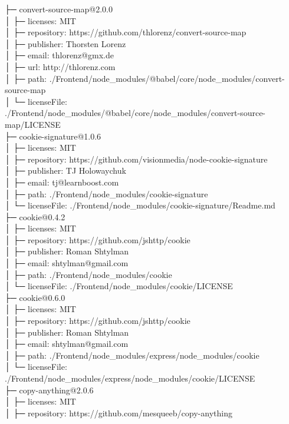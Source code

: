 ├─ convert-source-map@2.0.0\\
│  ├─ licenses: MIT\\
│  ├─ repository: https://github.com/thlorenz/convert-source-map\\
│  ├─ publisher: Thorsten Lorenz\\
│  ├─ email: thlorenz@gmx.de\\
│  ├─ url: http://thlorenz.com\\
│  ├─ path: ./Frontend/node\_modules/@babel/core/node\_modules/convert-source-map\\
│  └─ licenseFile: ./Frontend/node\_modules/@babel/core/node\_modules/convert-source-map/LICENSE\\
├─ cookie-signature@1.0.6\\
│  ├─ licenses: MIT\\
│  ├─ repository: https://github.com/visionmedia/node-cookie-signature\\
│  ├─ publisher: TJ Holowaychuk\\
│  ├─ email: tj@learnboost.com\\
│  ├─ path: ./Frontend/node\_modules/cookie-signature\\
│  └─ licenseFile: ./Frontend/node\_modules/cookie-signature/Readme.md\\
├─ cookie@0.4.2\\
│  ├─ licenses: MIT\\
│  ├─ repository: https://github.com/jshttp/cookie\\
│  ├─ publisher: Roman Shtylman\\
│  ├─ email: shtylman@gmail.com\\
│  ├─ path: ./Frontend/node\_modules/cookie\\
│  └─ licenseFile: ./Frontend/node\_modules/cookie/LICENSE\\
├─ cookie@0.6.0\\
│  ├─ licenses: MIT\\
│  ├─ repository: https://github.com/jshttp/cookie\\
│  ├─ publisher: Roman Shtylman\\
│  ├─ email: shtylman@gmail.com\\
│  ├─ path: ./Frontend/node\_modules/express/node\_modules/cookie\\
│  └─ licenseFile: ./Frontend/node\_modules/express/node\_modules/cookie/LICENSE\\
├─ copy-anything@2.0.6\\
│  ├─ licenses: MIT\\
│  ├─ repository: https://github.com/mesqueeb/copy-anything\\
